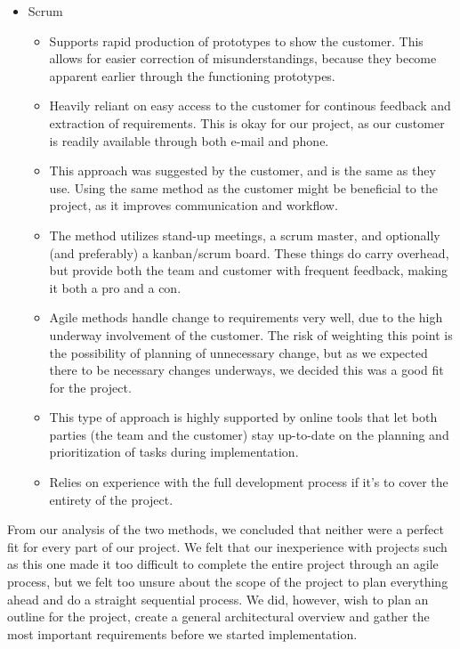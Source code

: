 \begin{itemize}
	\item Scrum
	\begin{itemize}
		\item Supports rapid production of prototypes to show the customer. This allows for easier correction of misunderstandings, because they become apparent earlier through the functioning prototypes.
		\item Heavily reliant on easy access to the customer for continous feedback and extraction of requirements. This is okay for our project, as our customer is readily available through both e-mail and phone. %
		\item This approach was suggested by the customer, and is the same as they use. Using the same method as the customer might be beneficial to the project, as it improves communication and workflow.
		\item The method utilizes stand-up meetings, a scrum master, and optionally (and preferably) a kanban/scrum board. These things do carry overhead, but provide both the team and customer with frequent feedback, making it both a pro and a con.
		\item Agile methods handle change to requirements very well, due to the high underway involvement of the customer. The risk of weighting this point is the possibility of planning of unnecessary change, but as we expected there to be necessary changes underways, we decided this was a good fit for the project.
		\item This type of approach is highly supported by online tools that let both parties (the team and the customer) stay up-to-date on the planning and prioritization of tasks during implementation.
		\item Relies on experience with the full development process if it’s to cover the entirety of the project.
	\end{itemize}
\end{itemize}
From our analysis of the two methods, we concluded that neither were a perfect fit for every part of our project. We felt that our inexperience with projects such as this one made it too difficult to complete the entire project through an agile process, but we felt too unsure about the scope of the project to plan everything ahead and do a straight sequential process. We did, however, wish to plan an outline for the project, create a general architectural overview and gather the most important requirements before we started implementation.

